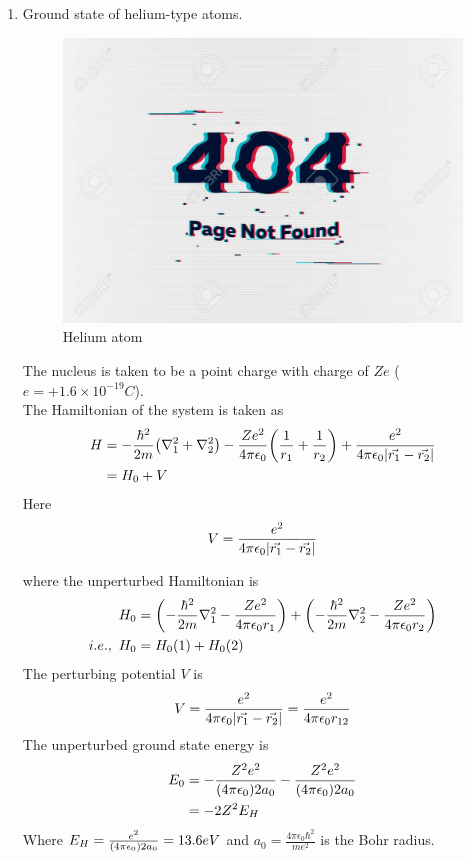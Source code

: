 \begin{enumerate}[label=Problem.\arabic*,start=1]
		
	
			
			\item Ground state of helium-type atoms.
			\begin{figure}
				\centering
				\includegraphics[width=0.5\linewidth]{Pictures/not-found.jpg}
				\caption{Helium atom}
			\end{figure}
			The nucleus is taken to be a point charge with charge of $Z e$ ($e=+1.6 \times 10^{-19} C$).\\
			The Hamiltonian of the system is taken as
			\begin{align}
				H &= -\frac{\hbar^2}{2 m} \qty(\nabla_1^2  +  \nabla_2^2) - \frac{Z e^2}{4 \pi \epsilon_0} \qty(\frac{1}{r_1} + \frac{1}{r_2}) + \frac{e^2}{4 \pi \epsilon_0 \abs{\vec{r_1} - \vec{r_2}}}\\
				&= H_0 + V
			\end{align}
			Here 
			\begin{equation}
			 	V = \frac{e^2}{4 \pi \epsilon_0 \abs{\vec{r_1} - \vec{r_2}}}
			\end{equation}
			
			where the unperturbed Hamiltonian is
			\begin{align*}
				H_0 &= \qty(-\frac{\hbar^2}{2 m} \nabla_1^2 - \frac{Z e^2}{4\pi \epsilon_0 r_1}) + \qty(-\frac{\hbar^2}{2 m} \nabla_2^2 - \frac{Z e^2}{4\pi \epsilon_0 r_2})\\
			i.e., \	H_0 &= H_0(1) + H_0(2)
			\end{align*}
			The perturbing potential $V$ is
			\begin{equation*}
				V = \frac{e^2}{4 \pi \epsilon_0 \abs{\vec{r_1} - \vec{r_2}}} = \frac{e^2}{4 \pi \epsilon_0 r_{1 2}}
			\end{equation*}
			The unperturbed ground state energy is
			\begin{align*}
				E_0 
				&= - \frac{Z^2 e^2}{\qty(4 \pi \epsilon_0) 2 a_0} - \frac{Z^2 e^2}{\qty(4 \pi \epsilon_0) 2 a_0}\\
				&= - 2 Z^2 E_H
			\end{align*}
			Where $E_H = \frac{e^2}{\qty(4 \pi \epsilon_0) 2 a_0} = 13.6 eV$ and $a_0 = \frac{4 \pi \epsilon_0  \hbar^2}{m e^2}$ is the Bohr radius.\\
			

\end{enumerate}
